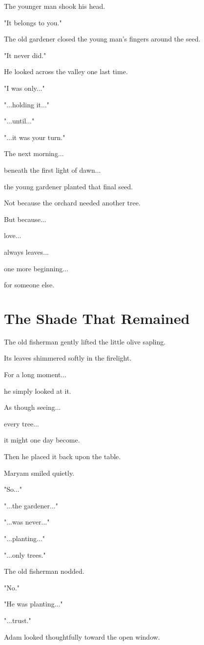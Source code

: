 \documentclass[12pt,openany]{book}
\begin{document}
The younger man shook his head.

"It belongs to you."

The old gardener closed the young man's fingers around the seed.

"It never did."

He looked across the valley one last time.

"I was only..."

"...holding it..."

"...until..."

"...it was your turn."

The next morning...

beneath the first light of dawn...

the young gardener planted that final seed.

Not because the orchard needed another tree.

But because...

love...

always leaves...

one more beginning...

for someone else.
\section*{The Shade That Remained}

The old fisherman gently lifted the little olive sapling.

Its leaves shimmered softly in the firelight.

For a long moment...

he simply looked at it.

As though seeing...

every tree...

it might one day become.

Then he placed it back upon the table.

Maryam smiled quietly.

"So..."

"...the gardener..."

"...was never..."

"...planting..."

"...only trees."

The old fisherman nodded.

"No."

"He was planting..."

"...trust."

Adam looked thoughtfully toward the open window.
\end{document}
